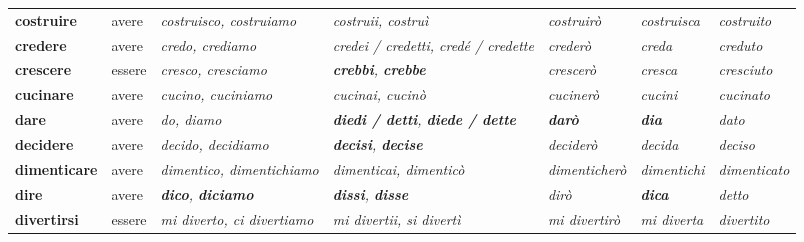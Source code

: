 \documentclass[11pt,a4paper,twoside,openright]{book}
\newcommand{\irr}[1]{{\color{exccol}\bfseries #1}}
\begin{document}
{\begin{xltabular}{\linewidth}{@{}>{\raggedright\arraybackslash}p{2.7cm} l L L l >{\raggedright\arraybackslash}p{1.9cm} l@{}}
\textbf{costruire} & avere & \textit{costruisco, costruiamo} & \textit{costruii, costruì} & \textit{costruirò} & \textit{costruisca} & \textit{costruito} \\
\textbf{credere} & avere & \textit{credo, crediamo} & \textit{credei / credetti, credé / credette} & \textit{crederò} & \textit{creda} & \textit{creduto} \\
\textbf{crescere} & essere & \textit{cresco, cresciamo} & \textit{\irr{crebbi}, \irr{crebbe}} & \textit{crescerò} & \textit{cresca} & \textit{cresciuto} \\
\textbf{cucinare} & avere & \textit{cucino, cuciniamo} & \textit{cucinai, cucinò} & \textit{cucinerò} & \textit{cucini} & \textit{cucinato} \\
\textbf{dare} & avere & \textit{do, diamo} & \textit{\irr{diedi / detti}, \irr{diede / dette}} & \textit{\irr{darò}} & \textit{\irr{dia}} & \textit{dato} \\
\textbf{decidere} & avere & \textit{decido, decidiamo} & \textit{\irr{decisi}, \irr{decise}} & \textit{deciderò} & \textit{decida} & \textit{deciso} \\
\textbf{dimenticare} & avere & \textit{dimentico, dimentichiamo} & \textit{dimenticai, dimenticò} & \textit{dimenticherò} & \textit{dimentichi} & \textit{dimenticato} \\
\textbf{dire} & avere & \textit{\irr{dico}, \irr{diciamo}} & \textit{\irr{dissi}, \irr{disse}} & \textit{dirò} & \textit{\irr{dica}} & \textit{detto} \\
\textbf{divertirsi} & essere & \textit{mi diverto, ci divertiamo} & \textit{mi divertii, si divertì} & \textit{mi divertirò} & \textit{mi diverta} & \textit{divertito} \\

\end{xltabular}}
\end{document}
